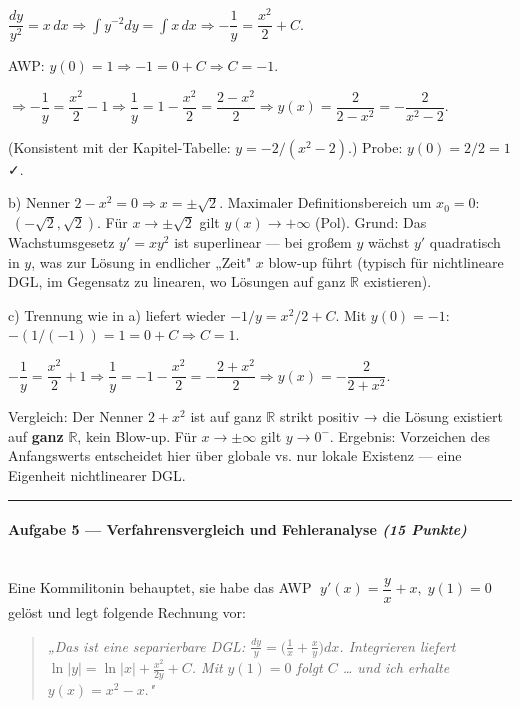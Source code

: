 \documentclass[11pt, a4paper]{article}
\begin{document}
$\dfrac{dy}{y^2}=x\,dx \Rightarrow \int y^{-2}dy = \int x\,dx \Rightarrow -\dfrac{1}{y}=\dfrac{x^2}{2}+C.$

AWP: $y(0)=1 \Rightarrow -1 = 0+C \Rightarrow C=-1.$

$\Rightarrow -\dfrac{1}{y}=\dfrac{x^2}{2}-1 \Rightarrow \dfrac{1}{y}=1-\dfrac{x^2}{2} = \dfrac{2-x^2}{2} \Rightarrow y(x)=\dfrac{2}{2-x^2}=-\dfrac{2}{x^2-2}.$

(Konsistent mit der Kapitel-Tabelle: $y=-2/(x^2-2)$.) Probe: $y(0)=2/2=1$ ✓.


b) Nenner $2-x^2=0 \Rightarrow x=\pm\sqrt{2}$. Maximaler Definitionsbereich um $x_0=0$: $\;(-\sqrt 2,\sqrt 2)$. Für $x\to \pm\sqrt 2$ gilt $y(x)\to +\infty$ (Pol). Grund: Das Wachstumsgesetz $y'=xy^2$ ist superlinear — bei großem $y$ wächst $y'$ quadratisch in $y$, was zur Lösung in endlicher „Zeit" $x$ blow-up führt (typisch für nichtlineare DGL, im Gegensatz zu linearen, wo Lösungen auf ganz $\mathbb R$ existieren).


c) Trennung wie in a) liefert wieder $-1/y = x^2/2 + C$. Mit $y(0)=-1$: $-(1/(-1))=1=0+C \Rightarrow C=1.$

$-\dfrac{1}{y}=\dfrac{x^2}{2}+1 \Rightarrow \dfrac{1}{y}=-1-\dfrac{x^2}{2}=-\dfrac{2+x^2}{2} \Rightarrow y(x)=-\dfrac{2}{2+x^2}.$

Vergleich: Der Nenner $2+x^2$ ist auf ganz $\mathbb R$ strikt positiv → die Lösung existiert auf \textbf{ganz} $\mathbb R$, kein Blow-up. Für $x\to\pm\infty$ gilt $y\to 0^-$. Ergebnis: Vorzeichen des Anfangswerts entscheidet hier über globale vs. nur lokale Existenz — eine Eigenheit nichtlinearer DGL.



\noindent\textcolor{rulegray}{\rule{\linewidth}{0.4pt}}


\paragraph{Aufgabe 5 — Verfahrensvergleich und Fehleranalyse \textit{(15 Punkte)}}\mbox{}\\[2pt]

Eine Kommilitonin behauptet, sie habe das AWP $\;y'(x) = \dfrac{y}{x} + x,\; y(1)=0\;$ gelöst und legt folgende Rechnung vor:


\begin{quote}
\textit{„Das ist eine separierbare DGL: $\frac{dy}{y}=\big(\frac{1}{x}+\frac{x}{y}\big)dx$. Integrieren liefert $\ln|y|=\ln|x|+\frac{x^2}{2y}+C$. Mit $y(1)=0$ folgt $C$ … und ich erhalte $y(x)= x^2 - x.$"}
\end{quote}
\end{document}
